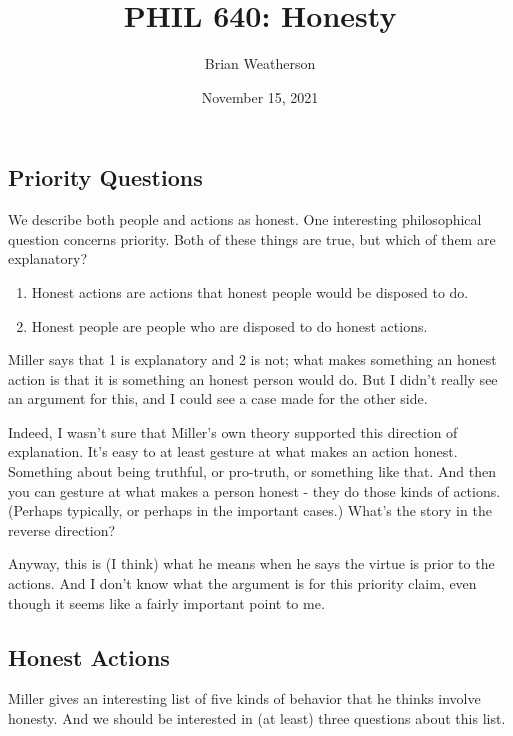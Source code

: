 \documentclass[
]{article}
\title{PHIL 640: Honesty}
\author{Brian Weatherson}
\date{November 15, 2021}
\providecommand{\tightlist}{%
  \setlength{\itemsep}{0pt}\setlength{\parskip}{0pt}}
\begin{document}
\maketitle

\hypertarget{priority-questions}{%
\subsection{Priority Questions}\label{priority-questions}}

We describe both people and actions as honest. One interesting
philosophical question concerns priority. Both of these things are true,
but which of them are explanatory?

\begin{enumerate}
\def\labelenumi{\arabic{enumi}.}
\tightlist
\item
  Honest actions are actions that honest people would be disposed to do.
\item
  Honest people are people who are disposed to do honest actions.
\end{enumerate}

Miller says that 1 is explanatory and 2 is not; what makes something an
honest action is that it is something an honest person would do. But I
didn't really see an argument for this, and I could see a case made for
the other side.

Indeed, I wasn't sure that Miller's own theory supported this direction
of explanation. It's easy to at least gesture at what makes an action
honest. Something about being truthful, or pro-truth, or something like
that. And then you can gesture at what makes a person honest - they do
those kinds of actions. (Perhaps typically, or perhaps in the important
cases.) What's the story in the reverse direction?

Anyway, this is (I think) what he means when he says the virtue is prior
to the actions. And I don't know what the argument is for this priority
claim, even though it seems like a fairly important point to me.

\hypertarget{honest-actions}{%
\subsection{Honest Actions}\label{honest-actions}}

Miller gives an interesting list of five kinds of behavior that he
thinks involve honesty. And we should be interested in (at least) three
questions about this list.
\end{document}
